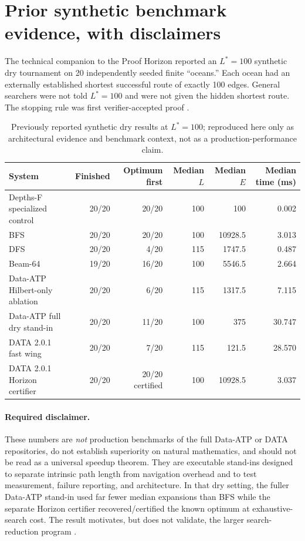 \section{Prior synthetic benchmark evidence, with disclaimers}
The technical companion to the Proof Horizon reported an $L^*=100$ synthetic dry tournament on 20 independently seeded finite ``oceans.'' Each ocean had an externally established shortest successful route of exactly 100 edges. General searchers were not told $L^*=100$ and were not given the hidden shortest route. The stopping rule was first verifier-accepted proof \cite{horizoncomp}.

\begin{table}[ht]
\centering
\small
\setlength{\tabcolsep}{4pt}
\begin{tabularx}{\textwidth}{>{\raggedright\arraybackslash}Xrrrrr}
\toprule
System & Finished & Optimum first & Median $L$ & Median $E$ & Median time (ms)\\
\midrule
Depths-F specialized control & 20/20 & 20/20 & 100 & 100 & 0.002\\
BFS & 20/20 & 20/20 & 100 & 10928.5 & 3.013\\
DFS & 20/20 & 4/20 & 115 & 1747.5 & 0.487\\
Beam-64 & 19/20 & 16/20 & 100 & 5546.5 & 2.664\\
Data-ATP Hilbert-only ablation & 20/20 & 6/20 & 115 & 1317.5 & 7.115\\
Data-ATP full dry stand-in & 20/20 & 11/20 & 100 & 375 & 30.747\\
DATA 2.0.1 fast wing & 20/20 & 7/20 & 115 & 121.5 & 28.570\\
DATA 2.0.1 Horizon certifier & 20/20 & 20/20 certified & 100 & 10928.5 & 3.037\\
\bottomrule
\end{tabularx}
\caption{Previously reported synthetic dry results at $L^*=100$; reproduced here only as architectural evidence and benchmark context, not as a production-performance claim.}
\end{table}

\paragraph{Required disclaimer.}
These numbers are \emph{not} production benchmarks of the full Data-ATP or DATA repositories, do not establish superiority on natural mathematics, and should not be read as a universal speedup theorem. They are executable stand-ins designed to separate intrinsic path length from navigation overhead and to test measurement, failure reporting, and architecture. In that dry setting, the fuller Data-ATP stand-in used far fewer median expansions than BFS while the separate Horizon certifier recovered/certified the known optimum at exhaustive-search cost. The result motivates, but does not validate, the larger search-reduction program \cite{horizoncomp}.

